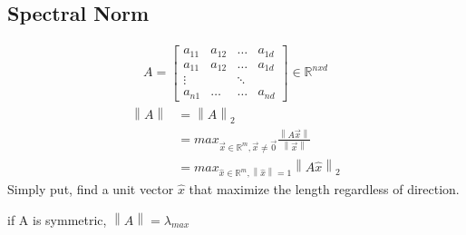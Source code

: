 \documentclass[12pt]{article}
\newcommand{\norm}[1]{\left\lVert#1\right\rVert}
\begin{document}
\subsection{Spectral Norm}
\begin{align*}
    A = \begin{bmatrix} 
                    a_{11} & a_{12} & \dots & a_{1d} \\
                    a_{11} & a_{12} & \dots & a_{1d} \\
                    \vdots &        & \ddots & \\
                    a_{n1} & \dots  & \dots      & a_{nd} 
    \end{bmatrix} \in \mathbb{R}^{nxd}
\end{align*}
\begin{align*}
    \norm{A} &= \norm{A}_2 \\
             &= max_{\vec{x} \in \mathbb{R}^m, \vec{x} \neq \vec{0}} \frac{\norm{A\vec{x}}}{\norm{\vec{x}}}\\
             &= max_{\hat{x} \in \mathbb{R}^m, \norm{\hat{x}} = 1} \norm{A\hat{x}}_2
\end{align*}
Simply put, find a unit vector $\hat{x}$ that maximize the length regardless of direction.\\

\begin{fact}
if A is symmetric, $\norm{A} = \lambda_{max}$
\end{fact}
\end{document}
